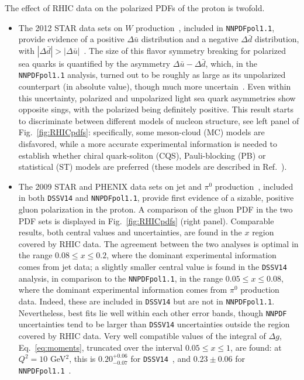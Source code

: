 The effect of RHIC data on the polarized PDFs of the proton is twofold.  
\begin{itemize}
\item The 2012 STAR data sets on $W$ production~\cite{Adamczyk:2014xyw}, 
included in {\tt NNPDFpol1.1}, provide evidence of a positive 
$\Delta\bar{u}$ distribution 
and a negative $\Delta\bar{d}$ distribution, with 
$|\Delta\bar{d}|>|\Delta\bar{u}|$~\cite{Nocera:2014gqa}. 
The size of this flavor symmetry breaking for polarized sea quarks is 
quantified by the asymmetry $\Delta\bar{u}-\Delta\bar{d}$, which,
in the {\tt NNPDFpol1.1} analysis, turned out to be roughly as large as its 
unpolarized counterpart (in absolute value), 
though much more uncertain~\cite{Nocera:2014rea}. Even within this uncertainty,
polarized and unpolarized light sea quark asymmetries show opposite sings,
with the polarized being definitely positive.  
This result starts to discriminate between different 
models of nucleon structure, see left panel of Fig.~\ref{fig:RHICpdfs}: 
specifically, some meson-cloud (MC) models are disfavored, while a more 
accurate experimental information is needed to establish whether 
chiral quark-soliton (CQS), Pauli-blocking (PB) or statistical (ST)
models are preferred (these models are described in 
Ref.~\cite{Chang:2014jba}).

\item The 2009 STAR and PHENIX data sets on jet and $\pi^0$ 
production~\cite{Adamczyk:2014ozi,Adare:2014hsq}, included in both {\tt DSSV14}
and {\tt NNPDFpol1.1}, provide first evidence
of a sizable, positive gluon polarization in the proton. 
A comparison of the gluon PDF in the two PDF sets is displayed in 
Fig.~\ref{fig:RHICpdfs} (right panel). Comparable results, both central values 
and uncertainties, are found in the $x$ region covered by RHIC data. 
The agreement between the two analyses is optimal in the
range $0.08\leq x \leq 0.2$, where the dominant experimental information comes
from jet data; a slightly smaller central value is found in the {\tt DSSV14} 
analysis, in comparison to the {\tt NNPDFpol1.1}, in the range 
$0.05\leq x \leq 0.08$, where the dominant experimental information comes from 
$\pi^0$ production data. Indeed, these are included in {\tt DSSV14} but are not
in {\tt NNPDFpol1.1}. Nevertheless, best fits lie well within each other error
bands, though {\tt NNPDF} uncertainties tend to be larger than {\tt DSSV14}
uncertainties outside the region covered by RHIC data.
Very well compatible values of the integral of $\Delta g$, 
Eq.~\eqref{eq:moments}, truncated over the interval $0.05\leq x \leq 1$, are 
found: at $Q^2=10$ GeV$^2$, this is $0.20^{+0.06}_{-0.07}$ for 
{\tt DSSV14}~\cite{deFlorian:2014yva}, and $0.23\pm 0.06$ for 
{\tt NNPDFpol1.1}~\cite{Nocera:2014gqa}.
\end{itemize}


